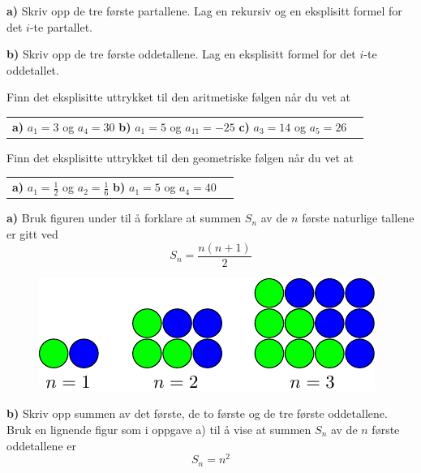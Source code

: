 



\opgt
\setcounter{section}{1}	

\textbf{a)} Skriv opp de tre første partallene. Lag en rekursiv og en eksplisitt formel for det $ i $-te partallet.\os
	
\textbf{b)} Skriv opp de tre første oddetallene. Lag en eksplisitt formel for det $ i $-te oddetallet. 

Finn det eksplisitte uttrykket til  den aritmetiske følgen når du vet at\os
\begin{tabular}{@{}l l}	
	\textbf{a)} $ a_1=3 $ og $ a_4 = 30 $ \os 
	\textbf{b)} $ a_1 = 5 $ og $ a_{11} = -25 $ \os
	\textbf{c)} $ a_3 =14 $ og $ a_5=26 $ 
\end{tabular}\os

Finn det eksplisitte uttrykket til den geometriske følgen når du vet at\os
\begin{tabular}{@{}l l}	
	\textbf{a)} $ a_1=\frac{1}{2} $ og $ a_2 = \frac{1}{6} $ \os 
	\textbf{b)} $ a_1 = 5 $ og $ a_4 = 40 $
\end{tabular} \os

\nes

\textbf{a)} Bruk figuren under til å forklare at summen $ S_n $ av de $ n $ første naturlige tallene er gitt ved
\[S_n=\frac{n(n+1)}{2}  \]

\begin{figure}
	\centering
	\includegraphics[]{../../fig/sum}
\end{figure}\vs
\textbf{b)} Skriv opp summen av det første, de to første og de tre første  oddetallene. Bruk en lignende figur som i oppgave a) til å vise at summen $ S_n $ av de $ n $ første oddetallene er
\[ S_n = n^2 \] 

